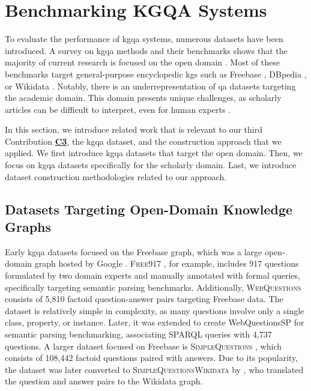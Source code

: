
\section{Benchmarking KGQA Systems}

To evaluate the performance of \gls{kgqa} systems, numerous datasets have been introduced. A survey on \gls{kgqa} methods and their benchmarks shows that the majority of current research is focused on the open domain \cite{peng_graph_2024}. Most of these benchmarks target general-purpose encyclopedic \glspl{kg} such as Freebase \cite{bollacker_freebase_2008}, DBpedia \cite{auer_dbpedia_2007}, or Wikidata \cite{vrandecic_wikidata_2014}. Notably, there is an underrepresentation of \gls{qa} datasets targeting the academic domain. This domain presents unique challenges, as scholarly articles can be difficult to interpret, even for human experts \cite{saikh_scienceqa_2022}.

In this section, we introduce related work that is relevant to our third Contribution \hyperref[enum:c3]{\textbf{C3}}, the \gls{kgqa} dataset, and the construction approach that we applied. We first introduce \gls{kgqa} datasets that target the open domain. Then, we focus on \gls{kgqa} datasets specifically for the scholarly domain. Last, we introduce dataset construction methodologies related to our approach.

\subsection{Datasets Targeting Open-Domain Knowledge Graphs}

Early \gls{kgqa} datasets focused on the Freebase graph, which was a large open-domain graph hosted by Google \cite{berant_semantic_2013}. \textsc{Free917} \cite{cai_large-scale_2013}, for example, includes 917 questions formulated by two domain experts and manually annotated with formal queries, specifically targeting semantic parsing benchmarks. Additionally, \textsc{WebQuestions} \cite{berant_semantic_2013} consists of 5,810 factoid question-answer pairs targeting Freebase data. The dataset is relatively simple in complexity, as many questions involve only a single class, property, or instance. Later, it was extended to create WebQuestionsSP \cite{yih_value_2016} for semantic parsing benchmarking, associating SPARQL queries with 4,737 questions. A larger dataset focused on Freebase is \textsc{SimpleQuestions} \cite{bordes_large-scale_2015}, which consists of 108,442 factoid questions paired with answers. Due to its popularity, the dataset was later converted to \textsc{SimpleQuestionsWikidata} by \textcite{diefenbach_question_2017}, who translated the question and answer pairs to the Wikidata graph.

